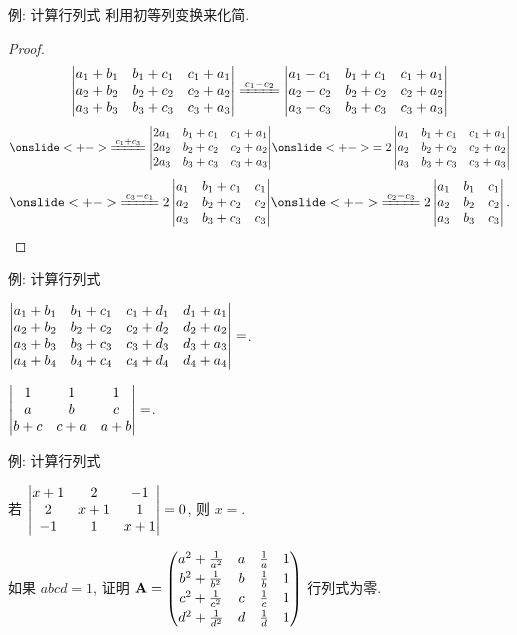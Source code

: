 \begin{frame}{例: 计算行列式}
	\onslide<+->
	利用初等列变换来化简.
	\onslide<+->
	\begin{proof}
		\[\detm{
			a_1+b_1&b_1+c_1&c_1+a_1\\
			a_2+b_2&b_2+c_2&c_2+a_2\\
			a_3+b_3&b_3+c_3&c_3+a_3
		}\xeq{c_1-c_2}\detm{
			a_1-c_1&b_1+c_1&c_1+a_1\\
			a_2-c_2&b_2+c_2&c_2+a_2\\
			a_3-c_3&b_3+c_3&c_3+a_3
		}\]\[
		\onslide<+->{\xeq{c_1+c_3}\detm{
			2a_1&b_1+c_1&c_1+a_1\\
			2a_2&b_2+c_2&c_2+a_2\\
			2a_3&b_3+c_3&c_3+a_3
		}}
		\onslide<+->{=2\detm{
			a_1&b_1+c_1&c_1+a_1\\
			a_2&b_2+c_2&c_2+a_2\\
			a_3&b_3+c_3&c_3+a_3
		}}\]\[
		\onslide<+->{\xeq{c_3-c_1}2\detm{
			a_1&b_1+c_1&c_1\\
			a_2&b_2+c_2&c_2\\
			a_3&b_3+c_3&c_3
		}}
		\onslide<+->{\xeq{c_2-c_3}2\detm{
			a_1&b_1&c_1\\
			a_2&b_2&c_2\\
			a_3&b_3&c_3
		}.\qedhere}\]
	\end{proof}
\end{frame}


\begin{frame}{例: 计算行列式}
	\onslide<+->
	\begin{exercise}
		$\left|\begin{matrix}
			a_1+b_1&b_1+c_1&c_1+d_1&d_1+a_1\\
			a_2+b_2&b_2+c_2&c_2+d_2&d_2+a_2\\
			a_3+b_3&b_3+c_3&c_3+d_3&d_3+a_3\\
			a_4+b_4&b_4+c_4&c_4+d_4&d_4+a_4
		\end{matrix}\right|=$.
	\end{exercise}
	\onslide<+->
	\begin{exercise}
		$\left|\begin{matrix}
			1&1&1\\
			a&b&c\\
			b+c&c+a&a+b
		\end{matrix}\right|=$\fillblank{\visible<+->{$0$}}.
	\end{exercise}
\end{frame}


\begin{frame}{例: 计算行列式}
	\onslide<+->
	\begin{exercise}
		若 $\left|\begin{matrix}
			x+1&2&-1\\
			2&x+1&1\\
			-1&1&x+1\end{matrix}\right|=0$, 则 $x=$\fillblank[3cm]{\visible<+->{$-3,\pm\sqrt3$}}.
	\end{exercise}
	\onslide<+->
	\begin{example}
		如果 $abcd=1$, 证明 ${\mathbf{A}}=\begin{pmatrix}
			a^2+\frac1{a^2}&a&\frac1a&1\\[2pt]
			b^2+\frac1{b^2}&b&\frac1b&1\\[2pt]
			c^2+\frac1{c^2}&c&\frac1c&1\\[2pt]
			d^2+\frac1{d^2}&d&\frac1d&1
		\end{pmatrix}$ 行列式为零.
	\end{example}
\end{frame}


